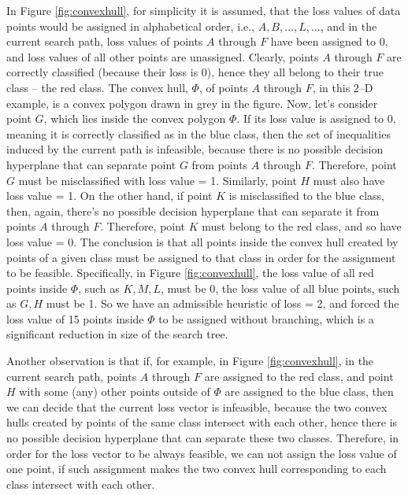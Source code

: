 In Figure \ref{fig:convexhull}, for simplicity it is assumed, that the
loss values of data points would be assigned in alphabetical order,
i.e., $A, B, \dots, L, \dots $, and in the current search path, loss
values of points $A$ through $F$ have been assigned to 0, and loss
values of all other points are unassigned. Clearly, points $A$ through
$F$ are correctly classified (because their loss is 0), hence they all
belong to their true class -- the red class. The convex hull, $\Phi$,
of points $A$ through $F$, in this 2--D example, is a convex polygon
drawn in grey in the figure. Now, let's consider point $G$, which lies
inside the convex polygon $\Phi$. If its loss value is assigned to 0,
meaning it is correctly classified as in the blue class, then the set
of inequalities induced by the current path is infeasible, because
there is no possible decision hyperplane that can separate point $G$
from points $A$ through $F$. Therefore, point $G$ must be
misclassified with loss value = 1. Similarly, point $H$ must also have
loss value = 1. On the other hand, if point $K$ is misclassified to
the blue class, then, again, there's no possible decision hyperplane
that can separate it from points $A$ through $F$. Therefore, point $K$
must belong to the red class, and so have loss value = 0. The
conclusion is that all points inside the convex hull created by points
of a given class must be assigned to that class in order for the
assignment to be feasible. Specifically, in Figure
\ref{fig:convexhull}, the loss value of all red points inside $\Phi$,
such as $K,M,L$, must be 0, the loss value of all blue points, such as
$G, H$ must be 1. So we have an admissible heuristic of loss = 2, and
forced the loss value of 15 points inside $\Phi$ to be assigned
without branching, which is a significant reduction in size of the
search tree.

Another observation is that if, for example, in Figure
\ref{fig:convexhull}, in the current search path, points $A$ through
$F$ are assigned to the red class, and point $H$ with some (any) other
points outside of $\Phi$ are assigned to the blue class, then we can
decide that the current loss vector is infeasible, because the two
convex hulls created by points of the same class intersect with each
other, hence there is no possible decision hyperplane that can
separate these two classes. Therefore, in order for the loss vector to
be always feasible, we can not assign the loss value of one point, if
such assignment makes the two convex hull corresponding to each class
intersect with each other.


